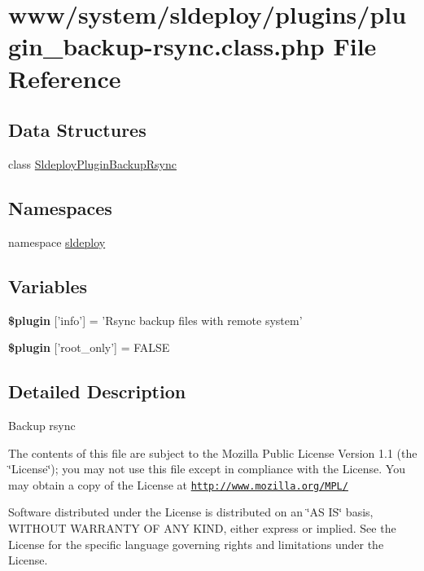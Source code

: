 \hypertarget{plugin__backup-rsync_8class_8php}{
\section{www/system/sldeploy/plugins/plugin\_\-backup-\/rsync.class.php File Reference}
\label{plugin__backup-rsync_8class_8php}
}
\subsection*{Data Structures}
\begin{DoxyCompactItemize}
\item 
class \hyperlink{class_sldeploy_plugin_backup_rsync}{SldeployPluginBackupRsync}
\end{DoxyCompactItemize}
\subsection*{Namespaces}
\begin{DoxyCompactItemize}
\item 
namespace \hyperlink{namespacesldeploy}{sldeploy}
\end{DoxyCompactItemize}
\subsection*{Variables}
\begin{DoxyCompactItemize}
\item 
\hypertarget{plugin__backup-rsync_8class_8php_a95edf69ebbeaeedb03bab3bb010f2af9}{
{\bfseries \$plugin} \mbox{[}'info'\mbox{]} = 'Rsync backup files with remote system'}
\label{plugin__backup-rsync_8class_8php_a95edf69ebbeaeedb03bab3bb010f2af9}

\item 
\hypertarget{plugin__backup-rsync_8class_8php_a1d302084fa15e3efe6c843cbb5096985}{
{\bfseries \$plugin} \mbox{[}'root\_\-only'\mbox{]} = FALSE}
\label{plugin__backup-rsync_8class_8php_a1d302084fa15e3efe6c843cbb5096985}

\end{DoxyCompactItemize}


\subsection{Detailed Description}
Backup rsync

The contents of this file are subject to the Mozilla Public License Version 1.1 (the \char`\"{}License\char`\"{}); you may not use this file except in compliance with the License. You may obtain a copy of the License at \href{http://www.mozilla.org/MPL/}{\tt http://www.mozilla.org/MPL/}

Software distributed under the License is distributed on an \char`\"{}AS IS\char`\"{} basis, WITHOUT WARRANTY OF ANY KIND, either express or implied. See the License for the specific language governing rights and limitations under the License. 